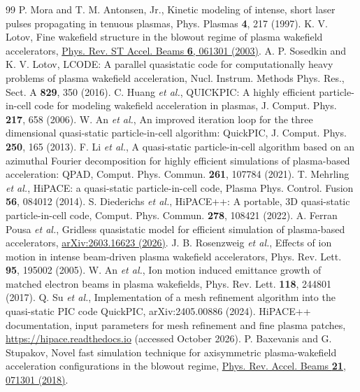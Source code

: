 \documentclass[aps,prab,reprint,floatfix,superscriptaddress,amsmath,amssymb]{revtex4-2}
\begin{document}
\begin{thebibliography}{99}
 P. Mora and T. M. Antonsen, Jr., Kinetic modeling of intense, short laser pulses propagating in tenuous plasmas, Phys. Plasmas \textbf{4}, 217 (1997).
 K. V. Lotov, Fine wakefield structure in the blowout regime of plasma wakefield accelerators, \href{https://doi.org/10.1103/PhysRevSTAB.6.061301}{Phys. Rev. ST Accel. Beams \textbf{6}, 061301 (2003)}.
 A. P. Sosedkin and K. V. Lotov, LCODE: A parallel quasistatic code for computationally heavy problems of plasma wakefield acceleration, Nucl. Instrum. Methods Phys. Res., Sect. A \textbf{829}, 350 (2016).
 C. Huang \textit{et al.}, QUICKPIC: A highly efficient particle-in-cell code for modeling wakefield acceleration in plasmas, J. Comput. Phys. \textbf{217}, 658 (2006).
 W. An \textit{et al.}, An improved iteration loop for the three dimensional quasi-static particle-in-cell algorithm: QuickPIC, J. Comput. Phys. \textbf{250}, 165 (2013).
 F. Li \textit{et al.}, A quasi-static particle-in-cell algorithm based on an azimuthal Fourier decomposition for highly efficient simulations of plasma-based acceleration: QPAD, Comput. Phys. Commun. \textbf{261}, 107784 (2021).
 T. Mehrling \textit{et al.}, HiPACE: a quasi-static particle-in-cell code, Plasma Phys. Control. Fusion \textbf{56}, 084012 (2014).
 S. Diederichs \textit{et al.}, HiPACE++: A portable, 3D quasi-static particle-in-cell code, Comput. Phys. Commun. \textbf{278}, 108421 (2022).
 A. Ferran Pousa \textit{et al.}, Gridless quasistatic model for efficient simulation of plasma-based accelerators, \href{https://arxiv.org/abs/2603.16623}{arXiv:2603.16623 (2026)}.
 J. B. Rosenzweig \textit{et al.}, Effects of ion motion in intense beam-driven plasma wakefield accelerators, Phys. Rev. Lett. \textbf{95}, 195002 (2005).
 W. An \textit{et al.}, Ion motion induced emittance growth of matched electron beams in plasma wakefields, Phys. Rev. Lett. \textbf{118}, 244801 (2017).
 Q. Su \textit{et al.}, Implementation of a mesh refinement algorithm into the quasi-static PIC code QuickPIC, arXiv:2405.00886 (2024).
 HiPACE++ documentation, input parameters for mesh refinement and fine plasma patches, \url{https://hipace.readthedocs.io} (accessed October 2026).
 P. Baxevanis and G. Stupakov, Novel fast simulation technique for axisymmetric plasma-wakefield acceleration configurations in the blowout regime, \href{https://doi.org/10.1103/PhysRevAccelBeams.21.071301}{Phys. Rev. Accel. Beams \textbf{21}, 071301 (2018)}.

\end{thebibliography}
\end{document}
